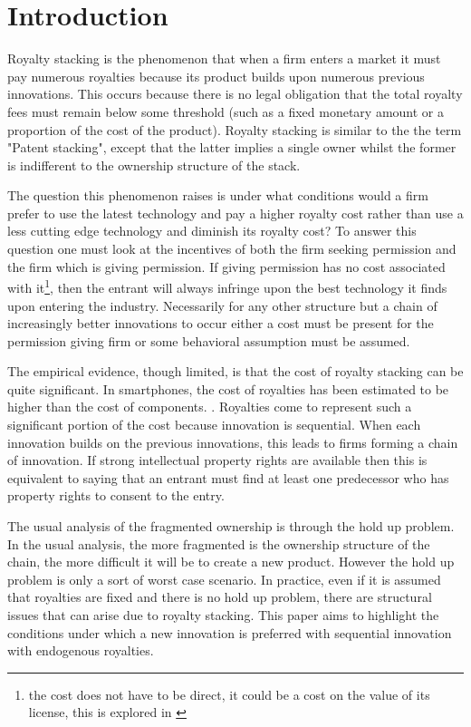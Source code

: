 \documentclass{article}
\begin{document}
\section{Introduction}

Royalty stacking is the phenomenon that when a firm enters a market it must pay numerous royalties because its product builds upon numerous previous innovations. This occurs because there is no legal obligation that the total royalty fees must remain below some threshold (such as a fixed monetary amount or a proportion of the cost of the product). Royalty stacking is similar to the the term "Patent stacking", except that the latter implies a single owner whilst the former is indifferent to the ownership structure of the stack. 

The question this phenomenon raises is under what conditions would a firm prefer to use the latest technology and pay a higher royalty cost rather than use a less cutting edge technology and diminish its royalty cost? To answer this question one must look at the incentives of both the firm seeking permission and the firm which is giving permission. If giving permission has no cost associated with it\footnote{the cost does not have to be direct, it could be a cost on the value of its license, this is explored in \cite{Katz1986}}, then the entrant will always infringe upon the best technology it finds upon entering the industry. Necessarily for any other structure but a chain of increasingly better innovations to occur either a cost must be present for the permission giving firm or some behavioral assumption must be assumed. 

The empirical evidence, though limited, is that the cost of royalty stacking can be quite significant. In smartphones, the cost of royalties has been estimated to be higher than the cost of components. \cite{Armstrong2014}. Royalties come to represent such a significant portion of the cost because innovation is sequential. When each innovation builds on the previous innovations, this leads to firms forming a chain of innovation. If strong intellectual property rights are available then this is equivalent to saying that an entrant must find at least one predecessor who has property rights to consent to the entry. 

The usual analysis of the fragmented ownership is through the hold up problem. In the usual analysis, the more fragmented is the ownership structure of the chain, the more difficult it will be to create a new product. However the hold up problem is only a sort of worst case scenario. In practice, even if it is assumed that royalties are fixed and there is no hold up problem, there are structural issues that can arise due to royalty stacking. This paper aims to highlight the conditions under which a new innovation is preferred with sequential innovation with endogenous royalties. 
\end{document}
